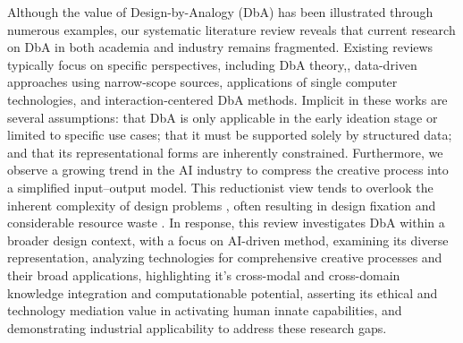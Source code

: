 Although the value of Design-by-Analogy (DbA) has been illustrated through numerous examples, our systematic literature review reveals that current research on DbA in both academia and industry remains fragmented. Existing reviews typically focus on specific perspectives, including DbA theory,\cite{song2018characterizing,linsey2008modality,linsey2008increasing}, data-driven approaches using narrow-scope sources\cite{jiang2022data,fu2014bio,}, applications of single computer technologies\cite{aamodt1994case, chakrabarti2011computer, ghane2024semantic, regenwetter2022deep}, and interaction-centered DbA methods.\cite{tseng2008role, marshall2016analogy, verhaegen2013refinements} Implicit in these works are several assumptions: that DbA is only applicable in the early ideation stage or limited to specific use cases; that it must be supported solely by structured data; and that its representational forms are inherently constrained. Furthermore, we observe a growing trend in the AI industry to compress the creative process into a simplified input–output model. This reductionist view tends to overlook the inherent complexity of design problems\cite{chakrabarty2024art, wadinambiarachchi2024effects} , often resulting in design fixation and considerable resource waste \cite{palani2022don}. In response, this review investigates DbA within a broader design context, with a focus on AI-driven method, examining its diverse representation, analyzing technologies for comprehensive creative processes and their broad applications, highlighting it's cross-modal and cross-domain knowledge integration and computationable potential, asserting its ethical and technology mediation value in activating human innate capabilities\cite{smits2019values, schecter2025role}, and demonstrating industrial applicability to address these research gaps.




